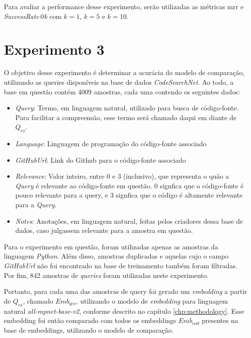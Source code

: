 Para avaliar a performance desse experimento, serão utilizadas as métricas \gls{mrr} e \textit{SuccessRate@k} com $k=1$, $k=5$ e $k=10$.

\section{Experimento 3}
\label{sec:experiments:experiment-3}
O objetivo desse experimento é determinar a acurácia do modelo de comparação, utilizando as queries disponíveis na base de dados \textit{CodeSearchNet}. Ao todo, a base em questão contém 4009 amostras, cada uma contendo os seguintes dados:

\begin{itemize}
    \item \textit{Query}: Termo, em linguagem natural, utilizado para busca de código-fonte. Para facilitar a compreensão, esse termo será chamado daqui em diante de $Q_{cs}$.
    \item \textit{Language}: Linguagem de programação do código-fonte associado
    \item \textit{GitHubUrl}: Link do Github para o código-fonte associado
    \item \textit{Relevance}: Valor inteiro, entre 0 e 3 (inclusivo), que representa o quão a \textit{Query} é relevante ao código-fonte em questão. 0 signfica que o código-fonte é pouco relevante para a query, e 3 signfica que o código é altamente relevante para a \textit{Query}.
    \item \textit{Notes}: Anotações, em linguagem natural, feitas pelos criadores dessa base de dados, caso julgassem relevante para a amostra em questão.
\end{itemize}

Para o experimento em questão, foram utilizadas apenas as amostras da linguagem \textit{Python}. Além disso, amostras duplicadas e aquelas cujo o campo \textit{GitHubUrl} não foi encontrado na base de treinamento também foram filtradas. Por fim, 842 amostras de \textit{queries} foram utilizadas neste experimento.

Portanto, para cada uma das amostras de query foi gerado um \textit{embedding} a partir de $Q_{cs}$, chamado $Emb_{qcs}$, utilizando o modelo de \textit{embedding} para linguagem natural \textit{all-mpnet-base-v2}, conforme descrito no capítulo \ref{chp:methodology}. Esse embedding foi então comparado com todos os embeddings $Emb_{cod}$ presentes na base de embeddings, utilizando o modelo de comparação.

